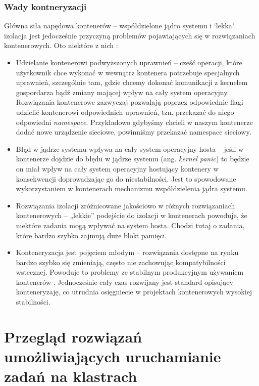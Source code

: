 \documentclass[10pt,a4paper,titlepage,twoside]{report}
\begin{document}
\subsection{Wady kontneryzacji}\indent \indent Główna siła napędowa kontenerów – współdzielone jądro systemu i ‘lekka’ izolacja jest jedocześnie przyczyną problemów pojawiających się w rozwiązaniach kontenerowych. Oto niektóre z nich \cite{ad25}:

\begin{itemize}
	\item Udzielanie kontenerowi podwyższonych uprawnień – cześć operacji, które użytkownik chce wykonać w wewnątrz kontenera potrzebuje specjalnych uprawnień, szczególnie tam, gdzie chcemy dokonać komunikacji z kernelem gospordarza bądź zmiany mającej wpływ na cały system operacyjny. Rozwiązania kontenerowe zazwyczaj pozwalają poprzez odpowiednie flagi udzielić kontenerowi odpowiednich uprawnień, tzn. przekazać do niego odpowiedni \textit{namespace}. Przykładowo gdybyśmy chcieli w naszym kontenerze dodać nowe urządzenie sieciowe, powinniśmy przekazać namespace sieciowy.
	\item Błąd w jądrze systemu wpływa na cały system operacyjny hosta – jeśli w kontenerze dojdzie do błędu w jądrze systemu (ang. \textit{kernel panic}) to będzie on miał wpływ na cały system operacyjny hostujący kontenery w konsekwencji doprowadzając go do niestabilności. Jest to spowodowane wykorzystaniem w kontenerach mechanizmu współdzielenia jądra systemu.
	\item Rozwiązania izolacji zróżnicowane jakościowo w różnych rozwiązaniach kontenerowych – „lekkie” podejście do izolacji w kontenerach powoduje, że niektóre zadania mogą wpływać na system hosta. Chodzi tutaj o zadania, które bardzo szybko zajmują duże bloki pamięci.
	\item Konteneryzacja jest pojęciem młodym – rozwiązania dostępne na rynku bardzo szybko się zmieniają, często nie zachowując kompatybilności wstecznej. Powoduje to problemy ze stabilnym produkcyjnym używaniem kontenerów \cite{ad25}. Jednocześnie cały czas rozwijany jest standard opisujący konteneryzaję, co utrudnia osięgniecie w projektach kontenerowych wysokiej stabilności.
\end{itemize}

\newpage

\onehalfspacing
\chapter{Przegląd rozwiązań umożliwiających uruchamianie zadań na klastrach}
\end{document}
